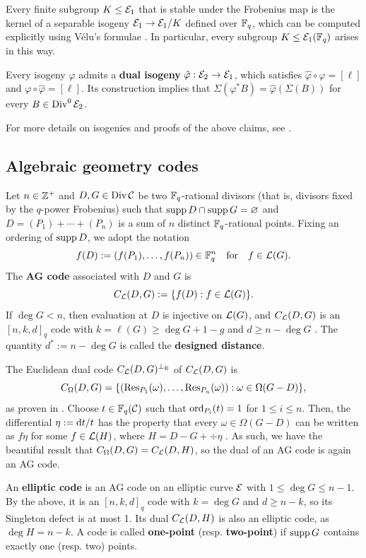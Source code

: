 \documentclass[twocolumn, 11pt]{scrartcl}
\begin{document}
Every finite subgroup $K\leq\mathcal{E}_1$ that is stable under the Frobenius map is the kernel of a separable isogeny $\mathcal{E}_1\to\mathcal{E}_1/K$ defined over $\mathbb{F}_q$, which can be computed explicitly using V\'elu's formulae \cite{velu1971isogenies}. In particular, every subgroup $K\leq\mathcal{E}_1(\mathbb{F}_q)$ arises in this way.

Every isogeny $\varphi$ admits a \textbf{dual isogeny} $\hat\varphi:\mathcal{E}_2\to\mathcal{E}_1$, which satisfies $\hat\varphi\circ\varphi=[\ell]$ and $\varphi\circ\hat\varphi=[\ell]$. Its construction implies that $\Sigma(\varphi^*B)=\hat\varphi(\Sigma(B))$ for every $B\in\operatorname{Div}^0\mathcal{E}_2$.

For more details on isogenies and proofs of the above claims, see \cite[\S III.4--6]{silverman2009arithmetic}.

\subsection{Algebraic geometry codes} \label{section:ecc}

Let $n\in\mathbb{Z}^+$ and $D,G\in\operatorname{Div}\mathcal{C}$ be two $\mathbb{F}_q$-rational divisors (that is, divisors fixed by the $q$-power Frobenius) such that $\operatorname{supp} D\cap\operatorname{supp} G=\varnothing$ and $D=(P_1)+\cdots+(P_n)$ is a sum of $n$ distinct $\mathbb{F}_q$-rational points. Fixing an ordering of $\operatorname{supp} D$, we adopt the notation
\[ f(D):=(f(P_1),\hdots,f(P_n))\in\mathbb{F}_q^n\quad\text{for}\quad f\in\mathcal{L}(G). \]
The \textbf{AG code} associated with $D$ and $G$ is
\[ C_\mathcal{L}(D,G):=\{f(D):f\in\mathcal{L}(G)\}. \]
If $\deg G<n$, then evaluation at $D$ is injective on $\mathcal{L}(G)$, and $C_\mathcal{L}(D,G)$ is an $[n,k,d]_q$ code with $k=\ell(G)\geq\deg G+1-g$ and $d\geq n-\deg G$ \cite[Thm.~2.2.2]{stichtenoth2009algebraic}. The quantity $d^*:=n-\deg G$ is called the \textbf{designed distance}.

The Euclidean dual code $C_\mathcal{L}(D,G)^{\perp_\mathrm{E}}$ of $C_\mathcal{L}(D,G)$ is
\[ C_\Omega(D,G)=\set*{(\Res_{P_1}(\omega),\hdots,\Res_{P_n}(\omega)):\omega\in\Omega(G-D)}, \]
as proven in \cite[Prop.~8]{o2008key}. Choose $t\in\mathbb{F}_q(\mathcal{C})$ such that $\operatorname{ord}_{P_i}(t)=1$ for $1\leq i\leq n$. Then, the differential $\eta:=\mathrm{d} t/t$ has the property that every $\omega\in\Omega(G-D)$ can be written as $f\eta$ for some $f\in\mathcal{L}(H)$, where $H=D-G+\div\eta$ \cite[\S8.1]{stichtenoth2009algebraic}. As such, we have the beautiful result that $C_\Omega(D,G)=C_\mathcal{L}(D,H)$, so the dual of an AG code is again an AG code.

An \textbf{elliptic code} is an AG code on an elliptic curve $\mathcal{E}$ with $1\leq\deg G\leq n-1$. By the above, it is an $[n,k,d]_q$ code with $k=\deg G$ and $d\geq n-k$, so its Singleton defect is at most 1. Its dual $C_\mathcal{L}(D,H)$ is also an elliptic code, as $\deg H=n-k$. A code is called \textbf{one-point} (resp. \textbf{two-point}) if $\operatorname{supp} G$ contains exactly one (resp. two) points.
\end{document}
